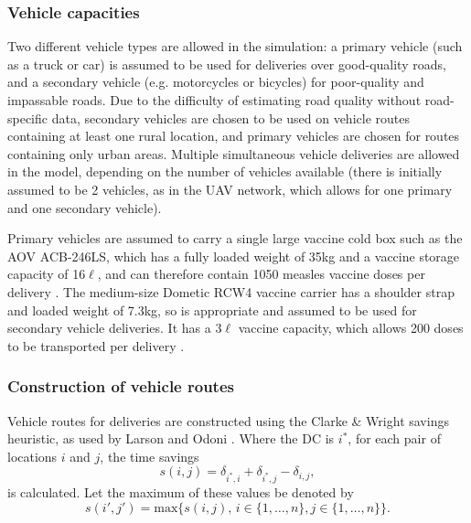 \subsubsection{Vehicle capacities}
Two different vehicle types are allowed in the simulation: a primary vehicle (such as a truck or car) is assumed to be used for deliveries over good-quality roads, and a secondary vehicle (e.g. motorcycles or bicycles) for poor-quality and impassable roads. Due to the difficulty of estimating road quality without road-specific data, secondary vehicles are chosen to be used on vehicle routes containing at least one rural location, and primary vehicles are chosen for routes containing only urban areas. Multiple simultaneous vehicle deliveries are allowed in the model, depending on the number of vehicles available (there is initially assumed to be 2 vehicles, as in the UAV network, which allows for one primary and one secondary vehicle).

Primary vehicles are assumed to carry a single large vaccine cold box such as the AOV ACB-246LS, which has a fully loaded weight of 35kg and a vaccine storage capacity of 16$\ell$, and can therefore contain 1050 measles vaccine doses per delivery \cite{who_carriers_2011}. 
The medium-size Dometic RCW4 vaccine carrier has a shoulder strap and loaded weight of 7.3kg, so is appropriate and assumed to be used for secondary vehicle deliveries. It has a 3$\ell$ vaccine capacity, which allows 200 doses to be transported per delivery \cite{who_carriers_2011}. 

\subsubsection{Construction of vehicle routes}
Vehicle routes for deliveries are constructed using the Clarke \& Wright savings heuristic, as used by Larson and Odoni \cite{larson_odoni_1981}. Where the DC is $i^{*}$, for each pair of locations $i$ and $j$, the time savings $$s(i,j) = \delta_{i^{*},i} + \delta_{i^{*},j} - \delta_{i,j},$$ is calculated. Let the maximum of these values be denoted by $$s(i',j') = \text{max}\{s(i,j), \, i \in \{1,\dots,n\}, j \in \{1,\dots,n\}\}.$$


